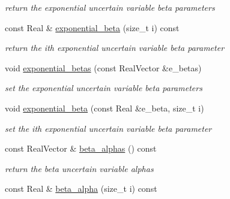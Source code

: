 \begin{DoxyCompactItemize}
\begin{DoxyCompactList}\small\item\em return the exponential uncertain variable beta parameters \end{DoxyCompactList}\item 
const Real \& \hyperlink{classPecos_1_1AleatoryDistParams_a4676b1ed33b846504cd18777e3380077}{exponential\+\_\+beta} (size\+\_\+t i) const \label{classPecos_1_1AleatoryDistParams_a4676b1ed33b846504cd18777e3380077}

\begin{DoxyCompactList}\small\item\em return the ith exponential uncertain variable beta parameter \end{DoxyCompactList}\item 
void \hyperlink{classPecos_1_1AleatoryDistParams_a30b18244a454118ccad84cb3974ea1fd}{exponential\+\_\+betas} (const Real\+Vector \&e\+\_\+betas)\label{classPecos_1_1AleatoryDistParams_a30b18244a454118ccad84cb3974ea1fd}

\begin{DoxyCompactList}\small\item\em set the exponential uncertain variable beta parameters \end{DoxyCompactList}\item 
void \hyperlink{classPecos_1_1AleatoryDistParams_a1f106b479b0dc3ea2d32dc27804f4895}{exponential\+\_\+beta} (const Real \&e\+\_\+beta, size\+\_\+t i)\label{classPecos_1_1AleatoryDistParams_a1f106b479b0dc3ea2d32dc27804f4895}

\begin{DoxyCompactList}\small\item\em set the ith exponential uncertain variable beta parameter \end{DoxyCompactList}\item 
const Real\+Vector \& \hyperlink{classPecos_1_1AleatoryDistParams_a023f99cc68a1914d595d6b6e38033711}{beta\+\_\+alphas} () const \label{classPecos_1_1AleatoryDistParams_a023f99cc68a1914d595d6b6e38033711}

\begin{DoxyCompactList}\small\item\em return the beta uncertain variable alphas \end{DoxyCompactList}\item 
const Real \& \hyperlink{classPecos_1_1AleatoryDistParams_a578bd5c6b3a3bb92dfc2294927f669cd}{beta\+\_\+alpha} (size\+\_\+t i) const \label{classPecos_1_1AleatoryDistParams_a578bd5c6b3a3bb92dfc2294927f669cd}


\end{DoxyCompactItemize}

